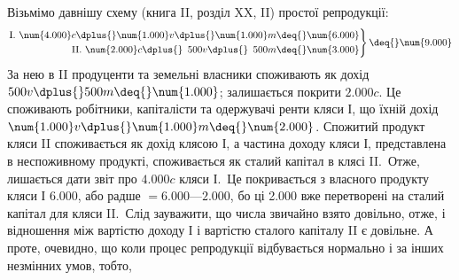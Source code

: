 Візьмімо давнішу схему (книга II, розділ XX, II) простої репродукції:
\[
 \left.\begin{aligned}
        \text{I. }\num{4.000} c \dplus{} \num{1.000} v \dplus{} \num{1.000} m \deq{} \num{6.000}\\
        \text{II. }\num{2.000} c \dplus{} \phantom{1}500 v \dplus{} \phantom{1}500 m \deq{} \num{3.000}
       \end{aligned}
 \right\}
  \deq{} \num{9.000}
\]
За нею в II продуценти та земельні власники споживають як дохід
$500 v \dplus{} 500 m \deq{} \num{1.000}$; залишається покрити $\num{2.000} c$. Це споживають
робітники, капіталісти та одержувачі ренти кляси І, що їхній дохід \deq{}
$\num{1.000} v \dplus{} \num{1.000} m \deq{} \num{2.000}$. Спожитий продукт кляси II споживається як дохід
клясою І, а частина доходу кляси І, представлена в неспоживному продукті,
споживається як сталий капітал в клясі II.~Отже, лишається дати звіт про
$\num{4.000} c$ кляси І.~Це покривається з власного продукту кляси І \deq{} \num{6.000}, або радше
$= \num{6.000} — \num{2.000}$, бо ці \num{2.000} вже перетворені на сталий капітал для кляси II.~Слід
зауважити, що числа звичайно взято довільно, отже, і відношення між вартістю
доходу І і вартістю сталого капіталу II є довільне. А проте, очевидно, що коли
процес репродукції відбувається нормально і за інших незмінних умов, тобто,
\parbreak{}  %
